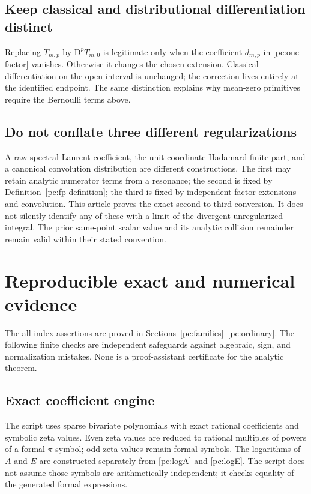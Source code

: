 \documentclass[11pt,a4paper]{article}
\numberwithin{equation}{section}
\theoremstyle{definition}
\newcommand{\D}{\mathrm D}
\newcommand{\src}[1]{\texttt{\detokenize{#1}}}
\begin{document}
\subsection{Keep classical and distributional differentiation distinct}
Replacing $T_{m,p}$ by $\D^pT_{m,0}$ is legitimate only when the coefficient $d_{m,p}$ in \eqref{pc:one-factor} vanishes. Otherwise it changes the chosen extension. Classical differentiation on the open interval is unchanged; the correction lives entirely at the identified endpoint. The same distinction explains why mean-zero primitives require the Bernoulli terms above.

\subsection{Do not conflate three different regularizations}
A raw spectral Laurent coefficient, the unit-coordinate Hadamard finite part, and a canonical convolution distribution are different constructions. The first may retain analytic numerator terms from a resonance; the second is fixed by Definition~\ref{pc:fp-definition}; the third is fixed by independent factor extensions and convolution. This article proves the exact second-to-third conversion. It does not silently identify any of these with a limit of the divergent unregularized integral. The prior same-point scalar value and its analytic collision remainder remain valid within their stated convention.

\section{Reproducible exact and numerical evidence}\label{pc:verification}
The all-index assertions are proved in Sections~\ref{pc:families}--\ref{pc:ordinary}. The following finite checks are independent safeguards against algebraic, sign, and normalization mistakes. None is a proof-assistant certificate for the analytic theorem.

\subsection{Exact coefficient engine}
The script \src{code/exact_checks.py} uses sparse bivariate polynomials with exact rational coefficients and symbolic zeta values. Even zeta values are reduced to rational multiples of powers of a formal $\pi$ symbol; odd zeta values remain formal symbols. The logarithms of $A$ and $E$ are constructed separately from \eqref{pc:logA} and \eqref{pc:logE}. The script does not assume those symbols are arithmetically independent; it checks equality of the generated formal expressions.
\end{document}
